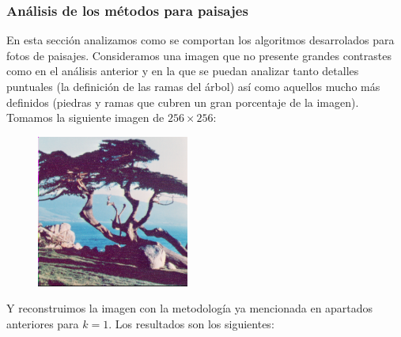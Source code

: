 \subsubsection{Análisis de los métodos para paisajes}

En esta sección analizamos como se comportan los algoritmos desarrolados para fotos de paisajes. Consideramos una imagen que no presente grandes contrastes como en el análisis anterior y en la que se puedan analizar tanto detalles puntuales (la definición de las ramas del árbol) así como aquellos mucho más definidos (piedras y ramas que cubren un gran porcentaje de la imagen). Tomamos la siguiente imagen de $256 \times 256$:

\begin{figure}[H]
\centering
\includegraphics[width=5cm]{fotos/paisaje/orig.png}
\end{figure}

Y reconstruimos la imagen con la metodología ya mencionada en apartados anteriores para $k=1$. Los resultados son los siguientes:

